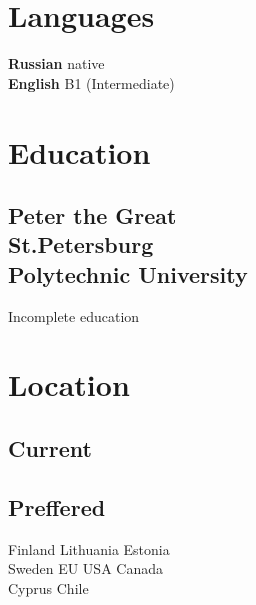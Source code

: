 \documentclass[]{schorscv}
\begin{document}
\begin{minipage}[t]{0.25\textwidth}


\section{Languages}
\sectionsep
\textbullet{} \textbf{Russian} native \\
\textbullet{} \textbf{English} B1 (Intermediate) \\
\sectionsep
\sectionsep


\section{Education} 
\subsection{Peter the Great \\ St.Petersburg \\ Polytechnic University}
Incomplete education \\
\sectionsep


\section{Location} 
\subsection{Current}
\sectionsep

\subsection{Preffered}
Finland \textbullet{} Lithuania \textbullet{} Estonia \\
Sweden \textbullet{} EU \textbullet{} USA  \textbullet{} Canada \\
Cyprus \textbullet{} Chile \\
\sectionsep



\end{minipage}
\end{document}
